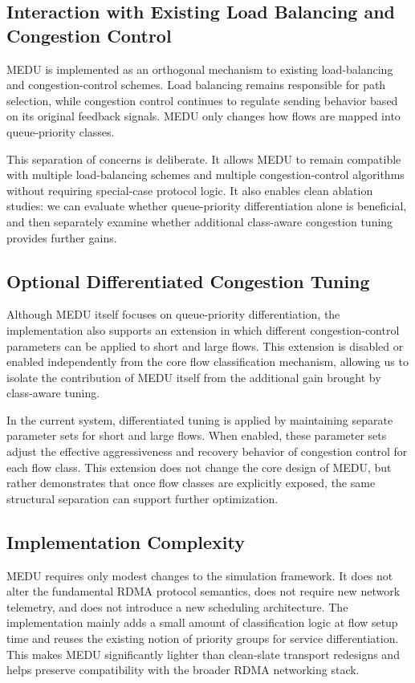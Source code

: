 \documentclass[conference]{IEEEtran}
\begin{document}
\subsection{Interaction with Existing Load Balancing and Congestion Control}

MEDU is implemented as an orthogonal mechanism to existing load-balancing and congestion-control schemes. Load balancing remains responsible for path selection, while congestion control continues to regulate sending behavior based on its original feedback signals. MEDU only changes how flows are mapped into queue-priority classes.

This separation of concerns is deliberate. It allows MEDU to remain compatible with multiple load-balancing schemes and multiple congestion-control algorithms without requiring special-case protocol logic. It also enables clean ablation studies: we can evaluate whether queue-priority differentiation alone is beneficial, and then separately examine whether additional class-aware congestion tuning provides further gains.

\subsection{Optional Differentiated Congestion Tuning}

Although MEDU itself focuses on queue-priority differentiation, the implementation also supports an extension in which different congestion-control parameters can be applied to short and large flows. This extension is disabled or enabled independently from the core flow classification mechanism, allowing us to isolate the contribution of MEDU itself from the additional gain brought by class-aware tuning.

In the current system, differentiated tuning is applied by maintaining separate parameter sets for short and large flows. When enabled, these parameter sets adjust the effective aggressiveness and recovery behavior of congestion control for each flow class. This extension does not change the core design of MEDU, but rather demonstrates that once flow classes are explicitly exposed, the same structural separation can support further optimization.

\subsection{Implementation Complexity}

MEDU requires only modest changes to the simulation framework. It does not alter the fundamental RDMA protocol semantics, does not require new network telemetry, and does not introduce a new scheduling architecture. The implementation mainly adds a small amount of classification logic at flow setup time and reuses the existing notion of priority groups for service differentiation. This makes MEDU significantly lighter than clean-slate transport redesigns and helps preserve compatibility with the broader RDMA networking stack.
\end{document}
